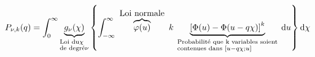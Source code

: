 \begin{equation}
   P _{\nu , k} (q) = \int _{0}^{\infty} \underbrace{g _{\nu} (\chi )}_{
   \begin{subarray}{ l }
    \text{Loi du} \chi \\ 
    \text {de degré} \nu
   \end{subarray}} 
   \left\{
    \int_{-\infty}^{\infty}
    \overbrace{\varphi ( u )}^{\mbox{ Loi normale }} k 
    \underbrace{\left [ \Phi (u ) -\Phi ( u - q \chi ) \right ]^{ k } }_{
    \begin{subarray}{ l }
        \text{ Probabilité que k variables soient } \\ \text{ contenues dans }[ u - q \chi ; u ] 
    \end{subarray}} 
    \mathrm{ d} u 
   \right\} 
   \mathrm{ d } \chi
\end{equation}
